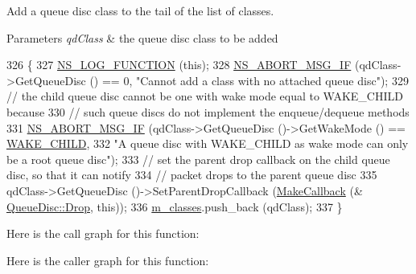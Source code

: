 Add a queue disc class to the tail of the list of classes. 


\begin{DoxyParams}{Parameters}
{\em qd\+Class} & the queue disc class to be added \\
\hline
\end{DoxyParams}

\begin{DoxyCode}
326 \{
327   \hyperlink{log-macros-disabled_8h_a90b90d5bad1f39cb1b64923ea94c0761}{NS\_LOG\_FUNCTION} (\textcolor{keyword}{this});
328   \hyperlink{group__fatal_ga6653324225bc139e46deea177614ceee}{NS\_ABORT\_MSG\_IF} (qdClass->GetQueueDisc () == 0, \textcolor{stringliteral}{"Cannot add a class with no attached queue
       disc"});
329   \textcolor{comment}{// the child queue disc cannot be one with wake mode equal to WAKE\_CHILD because}
330   \textcolor{comment}{// such queue discs do not implement the enqueue/dequeue methods}
331   \hyperlink{group__fatal_ga6653324225bc139e46deea177614ceee}{NS\_ABORT\_MSG\_IF} (qdClass->GetQueueDisc ()->GetWakeMode () == 
      \hyperlink{classns3_1_1QueueDisc_a0b9b32e71d5becf66e6ac4b3d3de7c8bad2dbf3b0b56e3e0d4d0f8f944c4d0fcd}{WAKE\_CHILD},
332                    \textcolor{stringliteral}{"A queue disc with WAKE\_CHILD as wake mode can only be a root queue disc"});
333   \textcolor{comment}{// set the parent drop callback on the child queue disc, so that it can notify}
334   \textcolor{comment}{// packet drops to the parent queue disc}
335   qdClass->GetQueueDisc ()->SetParentDropCallback (\hyperlink{group__makecallbackmemptr_ga9376283685aa99d204048d6a4b7610a4}{MakeCallback} (&
      \hyperlink{classns3_1_1QueueDisc_a4e8bbd3afbd927df3342dd015f30b08c}{QueueDisc::Drop}, \textcolor{keyword}{this}));
336   \hyperlink{classns3_1_1QueueDisc_a054d624a7a6f10a11cffec1f858feb3c}{m\_classes}.push\_back (qdClass);
337 \}
\end{DoxyCode}


Here is the call graph for this function\+:




Here is the caller graph for this function\+:


